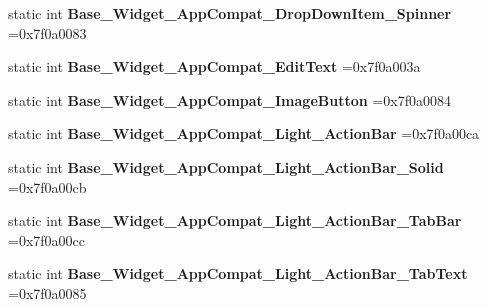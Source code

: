 \begin{DoxyCompactItemize}
\mbox{\label{classandroid_1_1support_1_1v7_1_1appcompat_1_1R_1_1style_a0de5f16831ec324f776283bef251d2fe}} 
static int {\bfseries Base\+\_\+\+Widget\+\_\+\+App\+Compat\+\_\+\+Drop\+Down\+Item\+\_\+\+Spinner} =0x7f0a0083
\item 
\mbox{\label{classandroid_1_1support_1_1v7_1_1appcompat_1_1R_1_1style_a157bb2a66a10a7481e93b66759292a28}} 
static int {\bfseries Base\+\_\+\+Widget\+\_\+\+App\+Compat\+\_\+\+Edit\+Text} =0x7f0a003a
\item 
\mbox{\label{classandroid_1_1support_1_1v7_1_1appcompat_1_1R_1_1style_a087c168445f7cba6e5d39e285dc4fa39}} 
static int {\bfseries Base\+\_\+\+Widget\+\_\+\+App\+Compat\+\_\+\+Image\+Button} =0x7f0a0084
\item 
\mbox{\label{classandroid_1_1support_1_1v7_1_1appcompat_1_1R_1_1style_af0cdcd431b2153539f3323263059287b}} 
static int {\bfseries Base\+\_\+\+Widget\+\_\+\+App\+Compat\+\_\+\+Light\+\_\+\+Action\+Bar} =0x7f0a00ca
\item 
\mbox{\label{classandroid_1_1support_1_1v7_1_1appcompat_1_1R_1_1style_a7cfbd26b93ba6b2fc9f84bf592d1e256}} 
static int {\bfseries Base\+\_\+\+Widget\+\_\+\+App\+Compat\+\_\+\+Light\+\_\+\+Action\+Bar\+\_\+\+Solid} =0x7f0a00cb
\item 
\mbox{\label{classandroid_1_1support_1_1v7_1_1appcompat_1_1R_1_1style_afb910003ae3b91c2d0deef7a4ea406a7}} 
static int {\bfseries Base\+\_\+\+Widget\+\_\+\+App\+Compat\+\_\+\+Light\+\_\+\+Action\+Bar\+\_\+\+Tab\+Bar} =0x7f0a00cc
\item 
\mbox{\label{classandroid_1_1support_1_1v7_1_1appcompat_1_1R_1_1style_ad619f3ccd98cb7d48435d25891d5051f}} 
static int {\bfseries Base\+\_\+\+Widget\+\_\+\+App\+Compat\+\_\+\+Light\+\_\+\+Action\+Bar\+\_\+\+Tab\+Text} =0x7f0a0085
\item 
\mbox{\label{classandroid_1_1support_1_1v7_1_1appcompat_1_1R_1_1style_a87a4b360a5225dddf3f62a61f982981e}} 

\end{DoxyCompactItemize}
